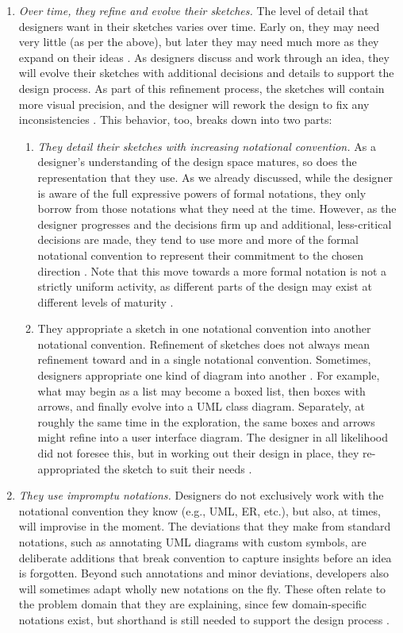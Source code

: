 \begin{enumerate}
\item \emph{Over time, they refine and evolve their sketches.} The level of detail that designers want in their sketches varies over time. Early on, they may need very little (as per the above), but later they may need much more as they expand on their ideas \citep{ossher12flexible}. As designers discuss and work through an idea, they will evolve their sketches with additional decisions and details to support the design process. As part of this refinement process, the sketches will contain more visual precision, and the designer will rework the design to fix any inconsistencies \citep{damm2000supporting}. This behavior, too, breaks down into two parts:
 \begin{enumerate}
 \item	\emph{They detail their sketches with increasing notational convention.} As a designer’s understanding of the design space matures, so does the representation that they use. As we already discussed, while the designer is aware of the full expressive powers of formal notations, they only borrow from those notations what they need at the time. However, as the designer progresses and the decisions firm up and additional, less-critical decisions are made, they tend to use more and more of the formal notational convention to represent their commitment to the chosen direction \citep{ossher2010flexible}. Note that this move towards a more formal notation is not a strictly uniform activity, as different parts of the design may exist at different levels of maturity \citep{petre2009insights}.
\item They appropriate a sketch in one notational convention into another notational convention. Refinement of sketches does not always mean refinement toward and in a single notational convention. Sometimes, designers appropriate one kind of diagram into another \citep{dekel2007notation}. For example, what may begin as a list may become a boxed list, then boxes with arrows, and finally evolve into a UML class diagram. Separately, at roughly the same time in the exploration, the same boxes and arrows might refine into a user interface diagram. The designer in all likelihood did not foresee this, but in working out their design in place, they re-appropriated the sketch to suit their needs \citep{mangano2012design}. 
 \end{enumerate}

\item \emph{They use impromptu notations.} Designers do not exclusively work with the notational convention they know (e.g., UML, ER, etc.), but also, at times, will improvise in the moment. The deviations that they make from standard notations, such as annotating UML diagrams with custom symbols, are deliberate additions that break convention to capture insights before an idea is forgotten. Beyond such annotations and minor deviations, developers also will sometimes adapt wholly new notations on the fly. These often relate to the problem domain that they are explaining, since few domain-specific notations exist, but shorthand is still needed to support the design process \cite{dekel2007notation}. 
\end{enumerate}

